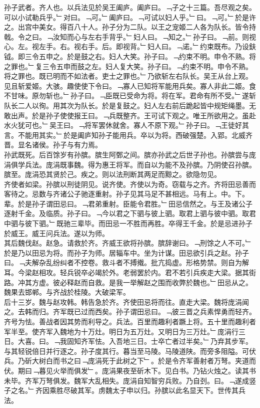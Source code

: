 \documentclass{zhvt-classic}
\begin{document}

\hspace*{2em}孙子武者。齐人也。以兵法见於吴王阖庐。阖庐曰。﹁子之十三篇。吾尽观之矣。可以小试勒兵乎。﹂对曰。﹁可。﹂阖庐曰。﹁可试以妇人乎。﹂曰。﹁可。﹂於是许之。出宫中美女。得百八十人。孙子分为二队。以王之宠姬二人各为队长。皆令持戟。令之曰。﹁汝知而心与左右手背乎。﹂妇人曰。﹁知之。﹂孙子曰。﹁前。则视心。左。视左手。右。视右手。后。即视背。﹂妇人曰。﹁诺。﹂约束既布。乃设鈇钺。即三令五申之。於是鼓之右。妇人大笑。孙子曰。﹁约束不明。申令不熟。将之罪也。﹂复三令五申而鼓之左。妇人复大笑。孙子曰。﹁约束不明。申令不熟。将之罪也。既已明而不如法者。吏士之罪也。﹂乃欲斩左右队长。吴王从台上观。见且斩爱姬。大骇。趣使使下令曰。﹁寡人已知将军能用兵矣。寡人非此二姬。食不甘味。原勿斩也。﹂孙子曰。﹁臣既已受命为将。将在军。君命有所不受。﹂遂斩队长二人以徇。用其次为队长。於是复鼓之。妇人左右前后跪起皆中规矩绳墨。无敢出声。於是孙子使使报王曰。﹁兵既整齐。王可试下观之。唯王所欲用之。虽赴水火犹可也。﹂吴王曰。﹁将军罢休就舍。寡人不原下观。﹂孙子曰。﹁王徒好其言。不能用其实。﹂於是阖庐知孙子能用兵。卒以为将。西破强楚。入郢。北威齐晋。显名诸侯。孙子与有力焉。\\
\hspace*{2em}孙武既死。后百馀岁有孙膑。膑生阿鄄之间。膑亦孙武之后世子孙也。孙膑尝与庞涓俱学兵法。庞涓既事魏。得为惠王将军。而自以为能不及孙膑。乃阴使召孙膑。膑至。庞涓恐其贤於己。疾之。则以法刑断其两足而黥之。欲隐勿见。\\
\hspace*{2em}齐使者如梁。孙膑以刑徒阴见。说齐使。齐使以为奇。窃载与之齐。齐将田忌善而客待之。忌数与齐诸公子驰逐重射。孙子见其马足不甚相远。马有上。中。下。辈。於是孙子谓田忌曰。﹁君弟重射。臣能令君胜。﹂田忌信然之。与王及诸公子逐射千金。及临质。孙子曰。﹁今以君之下驷与彼上驷。取君上驷与彼中驷。取君中驷与彼下驷。﹂既驰三辈毕。而田忌一不胜而再胜。卒得王千金。於是忌进孙子於威王。威王问兵法。遂以为师。\\
\hspace*{2em}其后魏伐赵。赵急。请救於齐。齐威王欲将孙膑。膑辞谢曰。﹁刑馀之人不可。﹂於是乃以田忌为将。而孙子为师。居辎车中。坐为计谋。田忌欲引兵之赵。孙子曰。﹁夫解杂乱纷纠者不控卷。救斗者不搏撠。批亢捣虚。形格势禁。则自为解耳。今梁赵相攻。轻兵锐卒必竭於外。老弱罢於内。君不若引兵疾走大梁。据其街路。冲其方虚。彼必释赵而自救。是我一举解赵之围而收弊於魏也。﹂田忌从之。魏果去邯郸。与齐战於桂陵。大破梁军。\\
\hspace*{2em}后十三岁。魏与赵攻韩。韩告急於齐。齐使田忌将而往。直走大梁。魏将庞涓闻之。去韩而归。齐军既已过而西矣。孙子谓田忌曰。﹁彼三晋之兵素悍勇而轻齐。齐号为怯。善战者因其势而利导之。兵法。百里而趣利者蹶上将。五十里而趣利者军半至。使齐军入魏地为十万灶。明日为五万灶。又明日为三万灶。﹂庞涓行三日。大喜。曰。﹁我固知齐军怯。入吾地三日。士卒亡者过半矣。﹂乃弃其步军。与其轻锐倍日并行逐之。孙子度其行。暮当至马陵。马陵道陕。而旁多阻隘。可伏兵。乃斫大树白而书之曰﹁庞涓死于此树之下﹂。於是令齐军善射者万弩。夹道而伏。期曰﹁暮见火举而俱发﹂。庞涓果夜至斫木下。见白书。乃钻火烛之。读其书未毕。齐军万弩俱发。魏军大乱相失。庞涓自知智穷兵败。乃自刭。曰。﹁遂成竖子之名。﹂齐因乘胜尽破其军。虏魏太子申以归。孙膑以此名显天下。世传其兵法。\\
\end{document}
